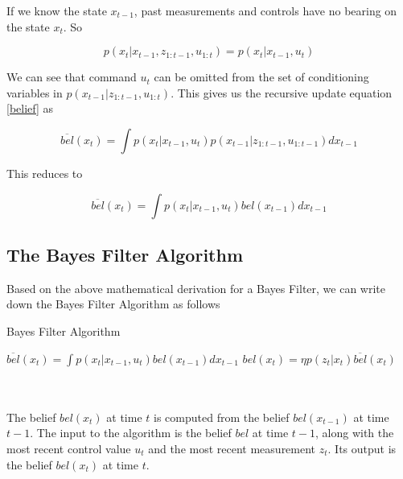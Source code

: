 \documentclass[conference]{IEEEtran}
\begin{document}
If we know the state $x_{t-1}$, past measurements and controls have no bearing on the state $x_t$. So

\begin{equation}
p(x_t|x_{t-1}, z_{1:t-1}, u_{1:t}) = p(x_t|x_{t-1}, u_t)
\end{equation}

We can see that command $u_t$ can be omitted from the set of conditioning variables in $p(x_{t-1}|z_{1:t-1}, u_{1:t})$. This gives us the recursive update equation \ref{belief} as

\begin{equation}
\overline{bel}(x_t) = \int p(x_t|x_{t-1}, u_t) p(x_{t-1}|z_{1:t-1}, u_{1:t-1}) dx_{t-1}
\end{equation}

This reduces to

\begin{equation}
\overline{bel}(x_t) = \int p(x_t|x_{t-1}, u_t) bel(x_{t-1}) dx_{t-1}
\end{equation}

\subsection{The Bayes Filter Algorithm}

Based on the above mathematical derivation for a Bayes Filter, we can write down the Bayes Filter Algorithm as follows \cite{thrun}

\begin{minipage}{\linewidth}
  \begin{algorithm}[H]
    \caption{Bayes Filter Algorithm}\label{AlgBayes}
    \begin{algorithmic}[1]
		\State $\overline{bel}(x_t) = \int p(x_t|x_{t-1}, u_t) bel(x_{t-1}) dx_{t-1}$
		\State $bel(x_t)= \eta p(z_t|x_t) \overline{bel}(x_t)$
	\EndFor
      \EndProcedure
    \end{algorithmic}
  \end{algorithm}
\end{minipage}\\\\

The belief $bel(x_t)$ at time $t$ is computed from the belief $bel(x_{t-1})$ at time $t-1$. The input to the algorithm is the belief $bel$ at time $t-1$, along with the most recent control value $u_t$ and the most recent measurement $z_t$. Its output is the belief $bel(x_t)$ at time $t$.\\
\end{document}
